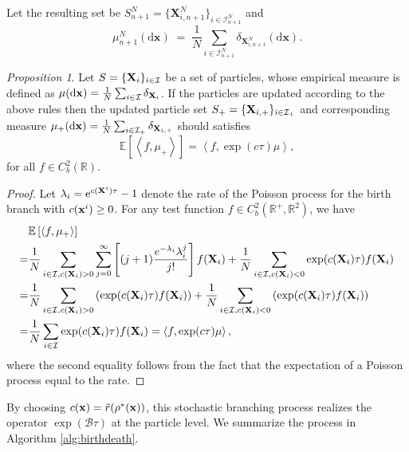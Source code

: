 \documentclass[a4paper,fleqn]{cas-sc}
\theoremstyle{definition}
\theoremstyle{remark}
\newtheorem{proposition}{Proposition}
\begin{document}
Let the resulting set be \(S_{n+1}^N=\{\mathbf X^N_{i,n+1}\}_{i\in\mathcal I_{n+1}^N}\) and
\[
\mu_{n+1}^{N}(\mathrm{d}\mathbf{x})
\;=\;
\frac{1}{N}\sum_{i\in\mathcal I_{n+1}^N}\delta_{\mathbf X^N_{i,n+1}}(\mathrm{d}\mathbf{x}).
\]


\begin{proposition}
    Let $S=\{\mathbf{X}_i\}_{i\in \mathcal I}$ be a set of particles, whose empirical measure is defined as $\mu (\mathrm{d} \mathbf{x}) = \frac{1}{N}\sum_{i\in \mathcal I }\delta_{\mathbf{X}_i}$. If the particles are updated according to the above rules then the updated particle set $S_+=\{ \mathbf{X}_{i,+}\}_{i\in {\mathcal I}_+}$ and corresponding  measure $ \mu_+ (\mathrm{d} \mathbf{x}) = \frac{1}{N}\sum_{i\in  {\mathcal  I}_+}\delta_{ \mathbf{X}_{i,+}}$ should satisfies 
    \begin{equation}
        \mathbb E [\left<f, \mu_+\right>] =   \left<f,\exp( c\tau)\mu\right>,
    \end{equation}
    for all $f\in C^2_b(\mathbb R)$.
\label{prop:stochastic_branch}
\end{proposition}

\begin{proof} Let $\lambda_i = {\rm e}^{c(\mathbf X^i) \tau} -1 $ denote the  rate of the Poisson process for the birth branch with $c(\mathbf x^i) \ge 0$. For any test function $f\in C^2_b(\mathbb R^+, \mathbb R^2)$, we have
\begin{equation}
\begin{aligned}
     & \mathbb E\left[\left<f,  \mu_+\right>\right]
    \\=& \frac{1}{N} \sum_{i\in \mathcal I ,c(\mathbf{X}_i)>0} \sum_{j=0}^{\infty} 
    \left[(j+1) \frac{e^{-\lambda_i} \lambda_i^j}{j!}\right] f(\mathbf{X}_i)
     + \frac{1}{N} \sum_{i\in \mathcal I , c(\mathbf{X}_i)<0}
    \exp( c(\mathbf{X}_i)\tau)f(\mathbf{X}_i) \\
    =& \frac{1}{N}\sum_{i\in \mathcal I ,c(\mathbf{X}_i)>0} 
    \left(
    \exp(c(\mathbf{X}_i)\tau)f(\mathbf{X}_i)
    \right) 
     + \frac{1}{N}\sum_{i\in \mathcal I , c(\mathbf{X}_i)<0}\left(
    \exp( c(\mathbf{X}_i)\tau)f(\mathbf{X}_i) \right)\\
    = & \frac{1}{N}\sum_{i\in \mathcal I}\exp( c(\mathbf{X}_i)\tau)f(\mathbf{X}_i) 
    = \left<f,\exp( c\tau)\mu\right>,
\end{aligned}
\end{equation}
where the second equality follows from the fact that the expectation of a Poisson process equal to the rate.
\end{proof}
By choosing $c(\mathbf x) = \tilde{r}(\rho^{\ast}(\mathbf x))$, this stochastic branching process realizes the operator $\exp(\mathcal{B}\tau)$ at the particle level. We summarize the process in Algorithm \ref{alg:birthdeath}.
\end{document}

